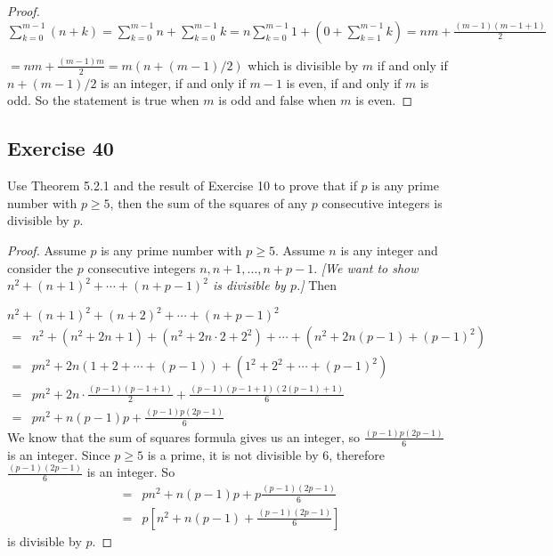\documentclass[14pt]{extarticle}
\newcommand{\dps}{\displaystyle}
\begin{document}
\begin{proof}
$\dps \sum_{k=0}^{m-1}(n+k) = \sum_{k=0}^{m-1}n + \sum_{k=0}^{m-1}k = n\sum_{k=0}^{m-1}1 + (0 + \sum_{k=1}^{m-1}k) = nm + \frac{(m-1)(m-1+1)}{2}$

$\dps = nm + \frac{(m-1)m}{2} = m(n + (m-1)/2)$ which is divisible by $m$ if and only if $n + (m-1)/2$ is an integer, if and only if $m-1$ is even, if and only if $m$ is odd. So the statement is true when $m$ is odd and false when $m$ is even.
\end{proof}

\subsection{Exercise 40}
Use Theorem 5.2.1 and the result of Exercise 10 to prove that if $p$ is any prime number with $p \geq 5$, then the sum of the squares of any $p$ consecutive integers is divisible by $p$.

\begin{proof}
Assume $p$ is any prime number with $p \geq 5$. Assume $n$ is any integer and consider the $p$ consecutive integers $n, n+1, \ldots, n+p-1$. {\it [We want to show $n^2 + (n+1)^2 + \cdots + (n+p-1)^2$ is divisible by $p$.]} Then

$n^2 + (n+1)^2 + (n+2)^2 + \cdots + (n+p-1)^2$
\[
\begin{array}{lll}
= & n^2 + (n^2 + 2n + 1) + (n^2 + 2n \cdot 2 + 2^2) + \cdots + (n^2 + 2n(p-1) + (p-1)^2) \\
= & pn^2 + 2n(1 + 2 + \cdots + (p-1)) + (1^2 + 2^2 + \cdots + (p-1)^2) \\
= & \dps pn^2 + 2n \cdot \frac{(p-1)(p-1+1)}{2} + \frac{(p-1)(p-1+1)(2(p-1)+1)}{6} \\
= & \dps pn^2 + n(p-1)p + \frac{(p-1)p(2p-1)}{6}
\end{array}
\]
We know that the sum of squares formula gives us an integer, so $\dps \frac{(p-1)p(2p-1)}{6}$ is an integer. Since $p \geq 5$ is a prime, it is not divisible by 6, therefore $\dps\frac{(p-1)(2p-1)}{6}$ is an integer. So
\[
\begin{array}{lll}
= & \dps pn^2 + n(p-1)p + p\frac{(p-1)(2p-1)}{6} \\
= & \dps p\left[n^2 + n(p-1) + \frac{(p-1)(2p-1)}{6}\right] 
\end{array}
\]
is divisible by $p$.
\end{proof}
\end{document}
